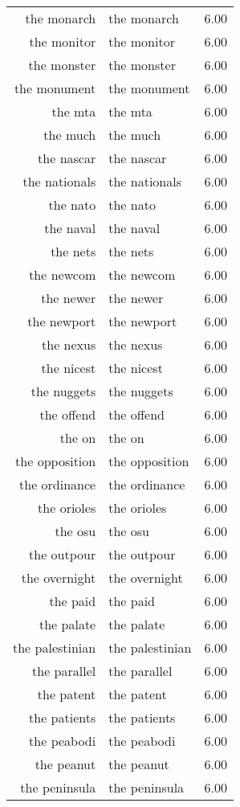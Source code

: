 \begin{table}[ht]
\begin{tabular}{rlr}
  the monarch & the monarch & 6.00 \\ 
  the monitor & the monitor & 6.00 \\ 
  the monster & the monster & 6.00 \\ 
  the monument & the monument & 6.00 \\ 
  the mta & the mta & 6.00 \\ 
  the much & the much & 6.00 \\ 
  the nascar & the nascar & 6.00 \\ 
  the nationals & the nationals & 6.00 \\ 
  the nato & the nato & 6.00 \\ 
  the naval & the naval & 6.00 \\ 
  the nets & the nets & 6.00 \\ 
  the newcom & the newcom & 6.00 \\ 
  the newer & the newer & 6.00 \\ 
  the newport & the newport & 6.00 \\ 
  the nexus & the nexus & 6.00 \\ 
  the nicest & the nicest & 6.00 \\ 
  the nuggets & the nuggets & 6.00 \\ 
  the offend & the offend & 6.00 \\ 
  the on & the on & 6.00 \\ 
  the opposition & the opposition & 6.00 \\ 
  the ordinance & the ordinance & 6.00 \\ 
  the orioles & the orioles & 6.00 \\ 
  the osu & the osu & 6.00 \\ 
  the outpour & the outpour & 6.00 \\ 
  the overnight & the overnight & 6.00 \\ 
  the paid & the paid & 6.00 \\ 
  the palate & the palate & 6.00 \\ 
  the palestinian & the palestinian & 6.00 \\ 
  the parallel & the parallel & 6.00 \\ 
  the patent & the patent & 6.00 \\ 
  the patients & the patients & 6.00 \\ 
  the peabodi & the peabodi & 6.00 \\ 
  the peanut & the peanut & 6.00 \\ 
  the peninsula & the peninsula & 6.00 \\ 

\end{tabular}
\end{table}
